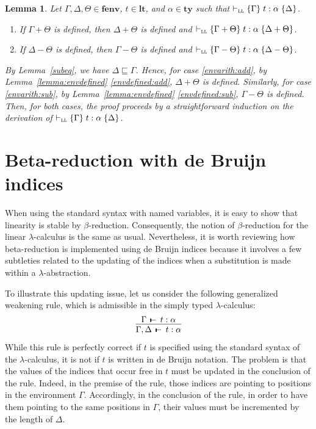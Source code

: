 \documentclass[submission,creativecommons]{eptcs}
\newtheorem{lemma}{Lemma}
\newcommand{\mybox}{\raisebox{3.5pt}{\framebox[7pt]{\rule{0mm}{0.3pt}}}}
\def\qed{\ifmmode\mybox\else{\unskip\nobreak\hfil
\penalty50\hskip1em\null\nobreak\hfil\mybox
\parfillskip=0pt\finalhyphendemerits=0\endgraf}\fi}
\newenvironment{proof}{%

\vspace{.7ex}
\noindent{\it Proof.} \rm}{\qed}
\def\joinrelm{\mathrel{\mkern-3mu}}
\def\relbar{\mathrel{\smash-}}
\def\tailpiece{\mathchoice
  {\vrule height 1ex width 0.3ex depth -.1ex}%
  {\vrule height 1ex width 0.3ex depth -.1ex}%
  {\vrule height 0.7ex width 0.3ex depth -.1ex}%
  {\vrule height 0.7ex width 0.3ex depth -.1ex}}
\def\seqsym{\mathrel{\tailpiece\joinrelm\relbar}}
\newcommand{\tseq}[3]{#1 \, \seqsym \, #2 : #3}
\newcommand{\tytm}[4]{\{#1\}\;#2:#3\;\{#4\}}
\newcommand{\der}[1]{\vdash_{#1}}
\newcommand{\Sll}{{\textsc{ll}}}
\newcommand{\ltm}{\mathord{\mathbf{lt}}}
\newcommand{\ty}{\mathord{\mathbf{ty}}}
\newcommand{\fenv}{\mathord{\mathbf{fenv}}}
\begin{document}
\begin{lemma}\label{lemma:envarith}
Let $\Gamma, \Delta, \Theta \in \fenv$, $t \in \ltm$, and $\alpha \in \ty$ such that $\der{\Sll}\tytm{\Gamma}{t}{\alpha}{\Delta}$.
\begin{enumerate}[label={\rm (\alph*)}, labelsep*=2ex, itemsep=0pt]
  \item If\/ $\Gamma + \Theta$ is defined, then $\Delta + \Theta$ is defined and
    $\der{\Sll}\tytm{\Gamma + \Theta}{t}{\alpha}{\Delta + \Theta}$. \label{envarith:add}
  \item If\/ $\Delta - \Theta$ is defined, then $\Gamma - \Theta$ is defined and
    $\der{\Sll}\tytm{\Gamma - \Theta}{t}{\alpha}{\Delta - \Theta}$. \label{envarith:sub}
\end{enumerate}
\begin{proof}
By Lemma~\ref{subeq}, we have $\Delta \sqsubseteq \Gamma$.
Hence, for case \ref{envarith:add}, by Lemma~\ref{lemma:envdefined} \ref{envdefined:add}, $\Delta + \Theta$ is defined.
Similarly, for case \ref{envarith:sub}, by Lemma~\ref{lemma:envdefined} \ref{envdefined:sub}, $\Gamma - \Theta$ is defined.
Then, for both cases, the proof proceeds by a straightforward induction on the derivation of
$\der{\Sll}\tytm{\Gamma}{t}{\alpha}{\Delta}$.
\end{proof}
\end{lemma}


\section{Beta-reduction with de Bruijn indices}

When using the standard syntax with named variables, it is easy to show that linearity is stable by $\beta$-reduction.
Consequently, the notion of $\beta$-reduction for the linear $\lambda$-calculus is the same as usual.
Nevertheless, it is worth reviewing how beta-reduction is implemented using de Bruijn indices because it involves a few
subtleties related to the updating of the indices when a substitution is made within a $\lambda$-abstraction.

To illustrate this updating issue, let us consider the following generalized weakening rule, which is admissible in
the simply typed $\lambda$-calculus:
$$
\infer{
\tseq{\Gamma,\Delta}{t}{\alpha}
}{
\tseq{\Gamma}{t}{\alpha}
}
$$
While this rule is perfectly correct if $t$ is specified using the standard syntax of the $\lambda$-calculus, it is not if $t$
is written in de Bruijn notation. The problem is that the values of the indices that occur free in $t$ must be updated in the
conclusion of the rule.
Indeed, in the premise of the rule, those indices are pointing to positions in the environment $\Gamma$.
Accordingly, in the conclusion of the rule, in order to have them pointing to the same positions in $\Gamma$,
their values must be incremented by the length of $\Delta$.
\end{document}
